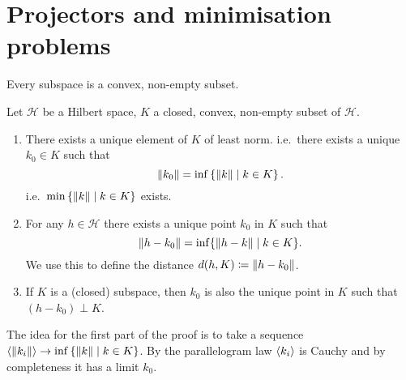 \section{Projectors and minimisation problems}
Every subspace is a convex, non-empty subset.
\begin{theorem}
Let $\mathcal{H}$ be a Hilbert space, $K$ a closed, convex, non-empty subset of $\mathcal{H}$.
\begin{enumerate}
\item There exists a unique element of $K$ of least norm. i.e.\ there exists a unique $k_0\in K$ such that
\[ \lVert k_0\rVert = \inf\left\{ \lVert k\rVert \;\middle|\; k\in K \right\}. \]
i.e.\ $\min\left\{ \lVert k\rVert \;\middle|\; k\in K \right\}$ exists.
\item For any $h\in\mathcal{H}$ there exists a unique point $k_0$ in $K$ such that
\[ \lVert h-k_0\rVert = \inf\{\lVert h-k\rVert\;|\; k\in K\}. \]
We use this to define the distance $d(h,K) \coloneqq \lVert h-k_0\rVert$.
\item If $K$ is a (closed) subspace, then $k_0$ is also the unique point in $K$ such that $(h-k_0)\perp K$.
\end{enumerate}
\end{theorem}
The idea for the first part of the proof is to take a sequence $\left\langle \lVert k_i\rVert \right\rangle\to \inf\left\{ \lVert k\rVert \;\middle|\; k\in K \right\}$. By the parallelogram law $\left\langle k_i \right\rangle$ is Cauchy and by completeness it has a limit $k_0$.
